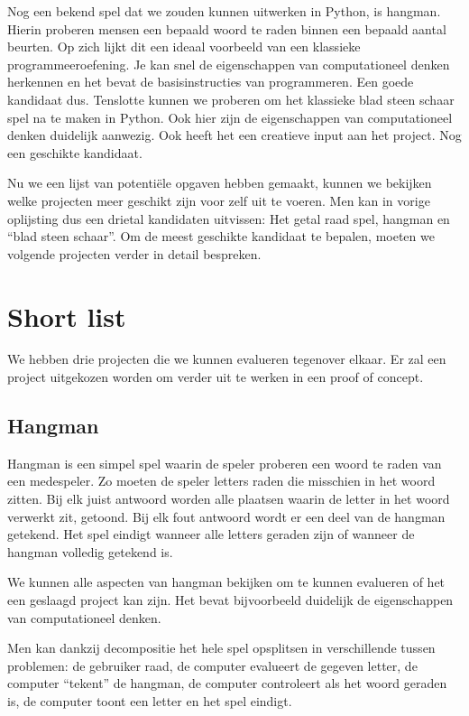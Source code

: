 Nog een bekend spel dat we zouden kunnen uitwerken in Python, is hangman. Hierin proberen mensen een bepaald woord te raden binnen een bepaald aantal beurten. Op zich lijkt dit een ideaal voorbeeld van een klassieke programmeeroefening. Je kan snel de eigenschappen van computationeel denken herkennen en het bevat de basisinstructies van programmeren. Een goede kandidaat dus.
Tenslotte kunnen we proberen om het klassieke blad steen schaar spel na te maken in Python. Ook hier zijn de eigenschappen van computationeel denken duidelijk aanwezig. Ook heeft het een creatieve input aan het project. Nog een geschikte kandidaat.

Nu we een lijst van potentiële opgaven hebben gemaakt, kunnen we bekijken welke projecten meer geschikt zijn voor zelf uit te voeren. Men kan in vorige oplijsting dus een drietal kandidaten uitvissen: Het getal raad spel, hangman en “blad steen schaar”. Om de meest geschikte kandidaat te bepalen, moeten we volgende projecten verder in detail bespreken.

\section{Short list}

We hebben drie projecten die we kunnen evalueren tegenover elkaar. Er zal een project uitgekozen worden om verder uit te werken in een proof of concept.

\subsection{Hangman}

Hangman is een simpel spel waarin de speler proberen een woord te raden van een medespeler. Zo moeten de speler letters raden die misschien in het woord zitten. Bij elk juist antwoord worden alle plaatsen waarin de letter in het woord verwerkt zit, getoond. Bij elk fout antwoord wordt er een deel van de hangman getekend. Het spel eindigt wanneer alle letters geraden zijn of wanneer de hangman volledig getekend is.

We kunnen alle aspecten van hangman bekijken om te kunnen evalueren of het een geslaagd project kan zijn. Het bevat bijvoorbeeld duidelijk de eigenschappen van computationeel denken. 

Men kan dankzij decompositie het hele spel opsplitsen in verschillende tussen problemen: de gebruiker raad, de computer evalueert de gegeven letter, de computer “tekent” de hangman, de computer controleert als het woord geraden is, de computer toont een letter en het spel eindigt. 

